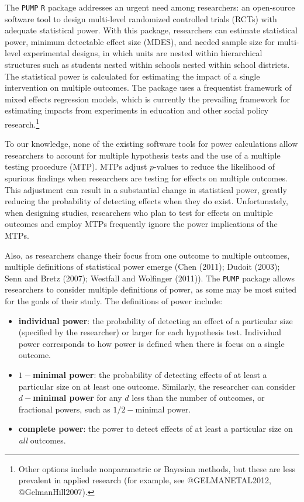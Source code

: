 \documentclass[
]{article}
\providecommand{\tightlist}{%
  \setlength{\itemsep}{0pt}\setlength{\parskip}{0pt}}
\begin{document}
The \texttt{PUMP} \texttt{R} package addresses an urgent need among
researchers: an open-source software tool to design multi-level
randomized controlled trials (RCTs) with adequate statistical power.
With this package, researchers can estimate statistical power, minimum
detectable effect size (MDES), and needed sample size for multi-level
experimental designs, in which units are nested within hierarchical
structures such as students nested within schools nested within school
districts. The statistical power is calculated for estimating the impact
of a single intervention on multiple outcomes. The package uses a
frequentist framework of mixed effects regression models, which is
currently the prevailing framework for estimating impacts from
experiments in education and other social policy
research.\footnote{Other options include nonparametric or Bayesian methods, but these are less prevalent in applied research (for example, see @GELMANETAL2012, @GelmanHill2007).}

To our knowledge, none of the existing software tools for power
calculations allow researchers to account for multiple hypothesis tests
and the use of a multiple testing procedure (MTP). MTPs adjust
\(p\)-values to reduce the likelihood of spurious findings when
researchers are testing for effects on multiple outcomes. This
adjustment can result in a substantial change in statistical power,
greatly reducing the probability of detecting effects when they do
exist. Unfortunately, when designing studies, researchers who plan to
test for effects on multiple outcomes and employ MTPs frequently ignore
the power implications of the MTPs.

Also, as researchers change their focus from one outcome to multiple
outcomes, multiple definitions of statistical power emerge (Chen (2011);
Dudoit (2003); Senn and Bretz (2007); Westfall and Wolfinger (2011)).
The \texttt{PUMP} package allows researchers to consider multiple
definitions of power, as some may be most suited for the goals of their
study. The definitions of power include:

\begin{itemize}
\tightlist
\item
  \textbf{individual power}: the probability of detecting an effect of a
  particular size (specified by the researcher) or larger for each
  hypothesis test. Individual power corresponds to how power is defined
  when there is focus on a single outcome.
\item
  \textbf{\(1-\)minimal power}: the probability of detecting effects of
  at least a particular size on at least one outcome. Similarly, the
  researcher can consider \textbf{\(d-\)minimal power} for any \(d\)
  less than the number of outcomes, or fractional powers, such as
  \(1/2-\)minimal power.
\item
  \textbf{complete power}: the power to detect effects of at least a
  particular size on \emph{all} outcomes.
\end{itemize}
\end{document}
